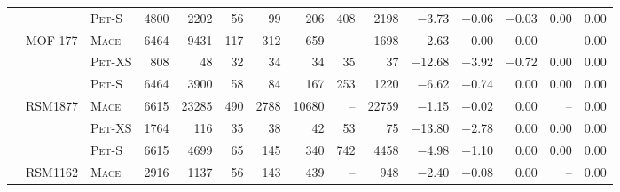 \begin{tabular}{lllr rrrrrr rrrrr}
                  &                    &    \textsc{Pet}-S  &        \num{4800}  &        \num{2202}  &          \num{56}  &          \num{99}  &         \num{206}  &         \num{408}  &        \num{2198}  &       \num{-3.73}  &       \num{-0.06}  &       \num{-0.03}  &        \num{0.00}  &        \num{0.00} \\ 
\addlinespace
                  &           MOF-177  &     \textsc{Mace}  &        \num{6464}  &        \num{9431}  &         \num{117}  &         \num{312}  &         \num{659}  &                --  &        \num{1698}  &       \num{-2.63}  &        \num{0.00}  &        \num{0.00}  &                --  &        \num{0.00} \\ 
                  &                    &   \textsc{Pet}-XS  &         \num{808}  &          \num{48}  &          \num{32}  &          \num{34}  &          \num{34}  &          \num{35}  &          \num{37}  &      \num{-12.68}  &       \num{-3.92}  &       \num{-0.72}  &        \num{0.00}  &        \num{0.00} \\ 
                  &                    &    \textsc{Pet}-S  &        \num{6464}  &        \num{3900}  &          \num{58}  &          \num{84}  &         \num{167}  &         \num{253}  &        \num{1220}  &       \num{-6.62}  &       \num{-0.74}  &        \num{0.00}  &        \num{0.00}  &        \num{0.00} \\ 
\addlinespace
                  &           RSM1877  &     \textsc{Mace}  &        \num{6615}  &       \num{23285}  &         \num{490}  &        \num{2788}  &       \num{10680}  &                --  &       \num{22759}  &       \num{-1.15}  &       \num{-0.02}  &        \num{0.00}  &                --  &        \num{0.00} \\ 
                  &                    &   \textsc{Pet}-XS  &        \num{1764}  &         \num{116}  &          \num{35}  &          \num{38}  &          \num{42}  &          \num{53}  &          \num{75}  &      \num{-13.80}  &       \num{-2.78}  &        \num{0.00}  &        \num{0.00}  &        \num{0.00} \\ 
                  &                    &    \textsc{Pet}-S  &        \num{6615}  &        \num{4699}  &          \num{65}  &         \num{145}  &         \num{340}  &         \num{742}  &        \num{4458}  &       \num{-4.98}  &       \num{-1.10}  &        \num{0.00}  &        \num{0.00}  &        \num{0.00} \\ 
\addlinespace
                  &           RSM1162  &     \textsc{Mace}  &        \num{2916}  &        \num{1137}  &          \num{56}  &         \num{143}  &         \num{439}  &                --  &         \num{948}  &       \num{-2.40}  &       \num{-0.08}  &        \num{0.00}  &                --  &        \num{0.00} \\ 

\end{tabular}

